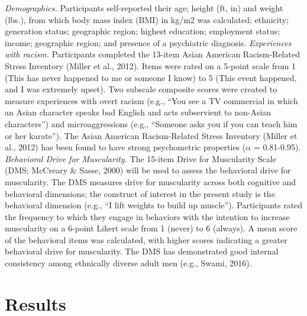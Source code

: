\documentclass[
  english,
  man, fleqn, noextraspace,floatsintext]{apa6}
\begin{document}
\emph{Demographics.} Participants self-reported their age; height (ft, in) and weight (lbs.), from which body mass index (BMI) in kg/m2 was calculated; ethnicity; generation status; geographic region; highest education; employment status; income; geographic region; and presence of a psychiatric diagnosis.
\emph{Experiences with racism.} Participants completed the 13-item Asian American Racism-Related Stress Inventory (Miller et al., 2012). Items were rated on a 5-point scale from 1 (This has never happened to me or someone I know) to 5 (This event happened, and I was extremely upset). Two subscale composite scores were created to measure experiences with overt racism (e.g., ``You see a TV commercial in which an Asian character speaks bad English and acts subservient to non-Asian characters'') and microaggressions (e.g., ``Someone asks you if you can teach him or her karate''). The Asian American Racism-Related Stress Inventory (Miller et al., 2012) has been found to have strong psychometric properties (\(\alpha\) = 0.81-0.95).
\emph{Behavioral Drive for Muscularity.} The 15-item Drive for Muscularity Scale (DMS; McCreary \& Sasse, 2000) will be used to assess the behavioral drive for muscularity. The DMS measures drive for muscularity across both cognitive and behavioral dimensions; the construct of interest in the present study is the behavioral dimension (e.g., ``I lift weights to build up muscle''). Participants rated the frequency to which they engage in behaviors with the intention to increase muscularity on a 6-point Likert scale from 1 (never) to 6 (always). A mean score of the behavioral items was calculated, with higher scores indicating a greater behavioral drive for muscularity. The DMS has demonstrated good internal consistency among ethnically diverse adult men (e.g., Swami, 2016).

\hypertarget{results}{%
\section{\texorpdfstring{\textbf{Results}}{Results}}\label{results}}
\end{document}
